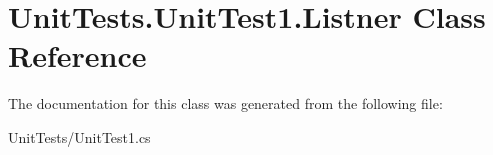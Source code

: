 \hypertarget{class_unit_tests_1_1_unit_test1_1_1_listner}{}\section{Unit\+Tests.\+Unit\+Test1.\+Listner Class Reference}
\label{class_unit_tests_1_1_unit_test1_1_1_listner}


The documentation for this class was generated from the following file\+:\begin{DoxyCompactItemize}
\item 
Unit\+Tests/Unit\+Test1.\+cs\end{DoxyCompactItemize}
